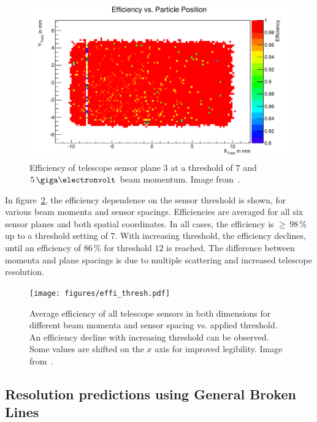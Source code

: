 \begin{figure}[tbp]
\centering
\includegraphics[width=\textwidth]{figures/plane3_effi_run37.pdf}
\caption[Telescope sensor efficiency~\cite{ref:thomas}]{Efficiency of telescope sensor plane $3$ at a threshold of $7$ and $5\,\giga\electronvolt$ beam momentum.
Image from~\cite{ref:thomas}.}
\label{fig:effi}
\end{figure}

In figure~\ref{fig:effi_thresh}, the efficiency dependence on the sensor threshold is shown, for various beam momenta and sensor spacings.
Efficiencies are averaged for all six sensor planes and both spatial coordinates.
In all cases, the efficiency is $\ge\,98\,\%$ up to a threshold setting of 7.
With increasing threshold, the efficiency declines, until an efficiency of $86\,\%$ for threshold $12$ is reached.
The difference between momenta and plane spacings is due to multiple scattering and increased telescope resolution.

\begin{figure}[tbp]
\centering
\texttt{[image: figures/effi\_thresh.pdf]}
\caption[Overall telescope sensor efficiency vs. threshold for different beam momenta and sensor spacings~\cite{ref:thomas}]{Average efficiency of all telescope sensors in both dimensions for different beam momenta and sensor spacing vs. applied threshold.
An efficiency decline with increasing threshold can be observed.
Some values are shifted on the $x$ axis for improved legibility.
Image from~\cite{ref:thomas}.}
\label{fig:effi_thresh}
\end{figure}

\subsection{Resolution predictions using General Broken Lines}

